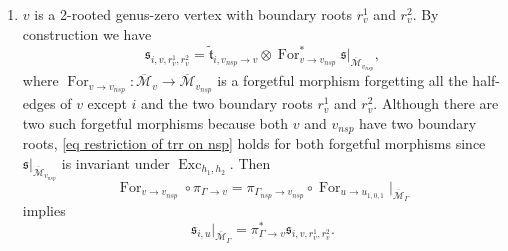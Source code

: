 \documentclass[11pt]{amsart}
\theoremstyle{definition}
\theoremstyle{remark}
\newcommand{\For}{\operatorname{For}}
\newcommand{\<}{\left<}
\renewcommand{\>}{\right>}
\numberwithin{equation}{section}
\def\Mbar{{\overline{\mathcal M}}}
\begin{document}
\begin{enumerate}
    \item $v$ is a 2-rooted genus-zero vertex with boundary roots $r_v^1$ and $r_v^2$.  
    By construction we have
    \begin{equation}\label{eq restriction of trr on nsp}
     \mathfrak s_{i,v,r_v^1,r_v^2}=\tilde{\mathfrak t}_{i, v_{nsp}\to v}\otimes \For^*_{v\to v_{nsp}}\mathfrak s\vert_{\Mbar_{v_{nsp}}},
    \end{equation}
    where $\For_{v\to v_{nsp}}\colon \Mbar_v \to \Mbar_{v_{nsp}}$ is a forgetful morphism forgetting all the half-edges of $v$ except $i$ and the two boundary roots $r_v^1$ and $r_v^2$. Although there are two such forgetful morphisms because both $v$ and $v_{nsp}$ have two boundary roots, \eqref{eq restriction of trr on nsp} holds for both forgetful morphisms since $\mathfrak s\vert_{\Mbar_{v_{nsp}}}$ is invariant under $\operatorname{Exc}_{h_1,h_2}$.
    Then 
    $$
    \For_{v\to v_{nsp}}\circ\pi_{\Gamma\to v}=\pi_{\Gamma_{nsp}\to v_{nsp}}\circ\For_{u\to u_{1,0,1}}\vert_{\Mbar_\Gamma}
    $$
    implies 
    \begin{equation}\label{eq behaviour of trr two rooted}
    \mathfrak s_{i,u}\vert_{\Mbar_{\Gamma}}=\pi^*_{\Gamma \to v}\mathfrak s_{i,v,r_v^1,r_v^2}.
    \end{equation}
\end{enumerate}
\end{document}
